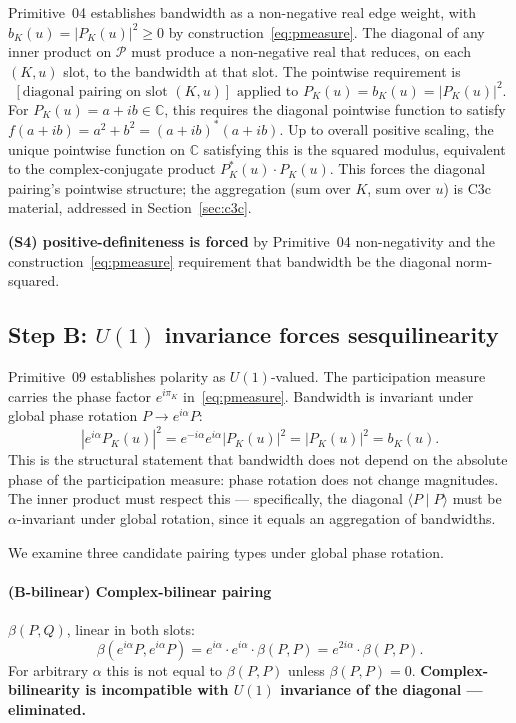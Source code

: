 \documentclass[11pt,a4paper]{article}
\begin{document}
Primitive~04 establishes bandwidth as a non-negative real edge weight, with $b_K(u) = |P_K(u)|^2 \geq 0$ by construction~\eqref{eq:pmeasure}. The diagonal of any inner product on $\mathcal{P}$ must produce a non-negative real that reduces, on each $(K, u)$ slot, to the bandwidth at that slot. The pointwise requirement is
\[
[\text{diagonal pairing on slot } (K, u)] \text{ applied to } P_K(u) = b_K(u) = |P_K(u)|^2.
\]
For $P_K(u) = a + ib \in \mathbb{C}$, this requires the diagonal pointwise function to satisfy $f(a + ib) = a^2 + b^2 = (a + ib)^* (a + ib)$. Up to overall positive scaling, the unique pointwise function on $\mathbb{C}$ satisfying this is the squared modulus, equivalent to the complex-conjugate product $P_K^*(u) \cdot P_K(u)$. This forces the diagonal pairing's pointwise structure; the aggregation (sum over $K$, sum over $u$) is C3c material, addressed in Section~\ref{sec:c3c}.

\textbf{(S4) positive-definiteness is forced} by Primitive~04 non-negativity and the construction~\eqref{eq:pmeasure} requirement that bandwidth be the diagonal norm-squared.

\subsection{Step B: $U(1)$ invariance forces sesquilinearity}

Primitive~09 establishes polarity as $U(1)$-valued. The participation measure carries the phase factor $e^{i \pi_K}$ in~\eqref{eq:pmeasure}. Bandwidth is invariant under global phase rotation $P \to e^{i \alpha} P$:
\begin{equation}
|e^{i \alpha} P_K(u)|^2 = e^{-i\alpha} e^{i\alpha} |P_K(u)|^2 = |P_K(u)|^2 = b_K(u).
\label{eq:u1bandwidth}
\end{equation}
This is the structural statement that bandwidth does not depend on the absolute phase of the participation measure: phase rotation does not change magnitudes. The inner product must respect this --- specifically, the diagonal $\langle P \mid P \rangle$ must be $\alpha$-invariant under global rotation, since it equals an aggregation of bandwidths.

We examine three candidate pairing types under global phase rotation.

\paragraph{(B-bilinear) Complex-bilinear pairing} $\beta(P, Q)$, linear in both slots:
\[
\beta(e^{i\alpha} P, e^{i\alpha} P) = e^{i\alpha} \cdot e^{i\alpha} \cdot \beta(P, P) = e^{2i\alpha} \cdot \beta(P, P).
\]
For arbitrary $\alpha$ this is not equal to $\beta(P, P)$ unless $\beta(P, P) = 0$. \textbf{Complex-bilinearity is incompatible with $U(1)$ invariance of the diagonal --- eliminated.}
\end{document}

